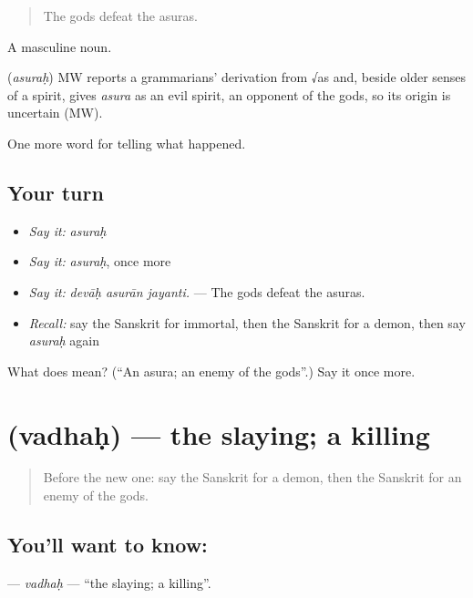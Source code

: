 \begin{quote}
The gods defeat the asuras.
\end{quote}

A masculine noun.

\begin{cousinweb}
\textbf{} (\emph{asuraḥ}) MW reports a grammarians' derivation from √as and, beside older senses of a spirit, gives \emph{asura} as an evil spirit, an opponent of the gods, so its origin is uncertain (MW).
\end{cousinweb}

\begin{grammarlens}[title={What you've built}]
One more word for telling what happened.
\end{grammarlens}

\subsection*{Your turn}
\begin{itemize}
\raggedright
  \item \emph{Say it:} \emph{asuraḥ}
  \item \emph{Say it:} \emph{asuraḥ}, once more
  \item \emph{Say it:} \emph{devāḥ asurān jayanti.} — The gods defeat the asuras.
  \item \emph{Recall:} say the Sanskrit for immortal, then the Sanskrit for a demon, then say \emph{asuraḥ} again
\end{itemize}

\begin{tcolorbox}[breakable,colback=teal!4,colframe=teal!35!black,title={Before you move on}]
What does  mean? (\textquotedblleft{}An asura; an enemy of the gods\textquotedblright{}.) Say it once more.
\end{tcolorbox}
\section[\texorpdfstring{\sk{वधः} (vadhaḥ)}{वधः (vadhaḥ)}]{ (vadhaḥ) — the slaying; a killing}

\label{lesson:SA-C334-vadhah}



\begin{quote}
Before the new one: say the Sanskrit for a demon, then the Sanskrit for an enemy of the gods.
\end{quote}

\subsection*{You'll want to know: }
\textbf{} — \emph{vadhaḥ} — \textquotedblleft{}the slaying; a killing\textquotedblright{}.

